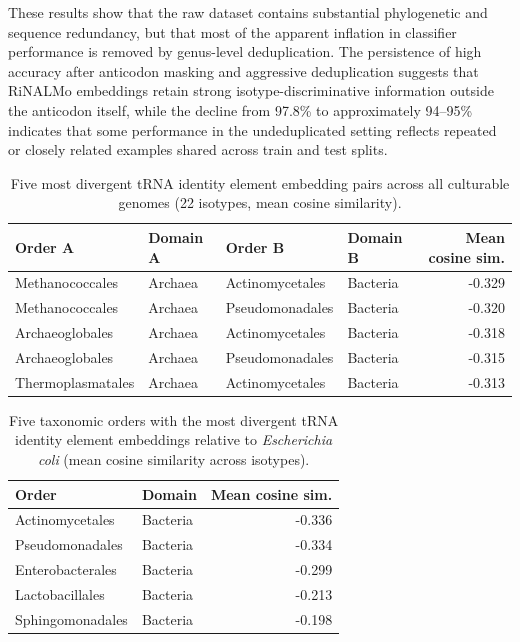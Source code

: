 \documentclass{article}
\begin{document}
These results show that the raw dataset contains substantial phylogenetic and sequence redundancy, but that most of the apparent inflation in classifier performance is removed by genus-level deduplication. The persistence of high accuracy after anticodon masking and aggressive deduplication suggests that RiNALMo embeddings retain strong isotype-discriminative information outside the anticodon itself, while the decline from 97.8\% to approximately 94--95\% indicates that some performance in the undeduplicated setting reflects repeated or closely related examples shared across train and test splits.

\begin{table}[h]
\centering
\caption{Five most divergent tRNA identity element embedding pairs across all culturable genomes (22 isotypes, mean cosine similarity).}
\label{tab:most_divergent_pairs}
\begin{tabular}{llll r}
\toprule
\textbf{Order A} & \textbf{Domain A} & \textbf{Order B} & \textbf{Domain B} & \textbf{Mean cosine sim.} \\
\midrule
  Methanococcales & Archaea & Actinomycetales & Bacteria & -0.329 \\
  Methanococcales & Archaea & Pseudomonadales & Bacteria & -0.320 \\
  Archaeoglobales & Archaea & Actinomycetales & Bacteria & -0.318 \\
  Archaeoglobales & Archaea & Pseudomonadales & Bacteria & -0.315 \\
  Thermoplasmatales & Archaea & Actinomycetales & Bacteria & -0.313 \\
\bottomrule
\end{tabular}
\end{table}


\begin{table}[h]
\centering
\caption{Five taxonomic orders with the most divergent tRNA identity element embeddings relative to \textit{Escherichia coli} (mean cosine similarity across isotypes).}
\label{tab:ecoli_most_divergent}
\begin{tabular}{ll r}
\toprule
\textbf{Order} & \textbf{Domain} & \textbf{Mean cosine sim.} \\
\midrule
  Actinomycetales & Bacteria & -0.336 \\
  Pseudomonadales & Bacteria & -0.334 \\
  Enterobacterales & Bacteria & -0.299 \\
  Lactobacillales & Bacteria & -0.213 \\
  Sphingomonadales & Bacteria & -0.198 \\
\bottomrule
\end{tabular}
\end{table}
\end{document}
